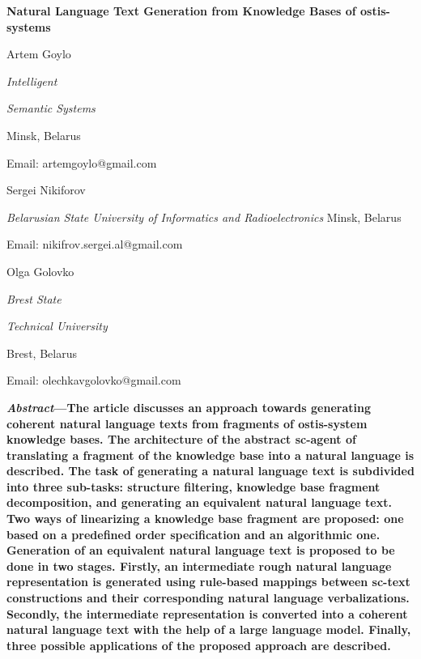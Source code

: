 \documentclass{scndocument}
\begin{document}
\begin{SCn}
    \begin{center}
    \huge
 \textbf{Natural Language Text Generation from
Knowledge Bases of ostis-systems}  
\end{center}
\begin{multicols}{3}
\begin{center}
Artem Goylo \par
\textit{Intelligent} \par
\textit{Semantic Systems} \par
Minsk, Belarus \par 
Email: artemgoylo@gmail.com \par
\columnbreak 
Sergei Nikiforov \par
\textit{Belarusian State University of Informatics and Radioelectronics} Minsk, Belarus \par
Email: nikifrov.sergei.al@gmail.com
\columnbreak 
\par
Olga Golovko \par 
\textit{Brest State} \par
\textit{Technical University} \par
Brest, Belarus \par
Email: olechkavgolovko@gmail.com
\end{center}
\end{multicols}
\begin{multicols}{2}
\begin{spacing}{0.65}
\begin{justify} 
\par
\par{\textbf{\textit{Abstract}—The article discusses an approach towards generating coherent natural language texts from fragments of ostis-system knowledge bases. The architecture of the abstract sc-agent of translating a fragment of the knowledge base into a natural language is described. The task of generating a natural language text is subdivided into three sub-tasks: structure filtering, knowledge base fragment decomposition, and generating an equivalent natural language text. Two ways of linearizing a knowledge base fragment are proposed: one based on a predefined order specification and an algorithmic one. Generation of an equivalent natural language text is proposed to be done in two stages. Firstly, an intermediate rough natural language representation is generated using rule-based mappings between sc-text constructions and their corresponding natural language verbalizations. Secondly, the intermediate representation is converted into a coherent natural language text with the help of a large language model. Finally, three possible applications of the proposed approach are described.} \par 
}
\end{justify}
\end{spacing}
\end{multicols}
\end{SCn}
\end{document}
